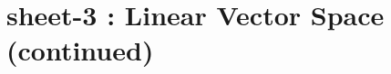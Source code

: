 \chapter{sheet-3 : Linear Vector Space (continued)}

\ifpdf
\graphicspath{{Chapter3/figs/}}
\else
\graphicspath{{Chapter3/figs/}}
\fi



	
	
	
	
	
%	
%
